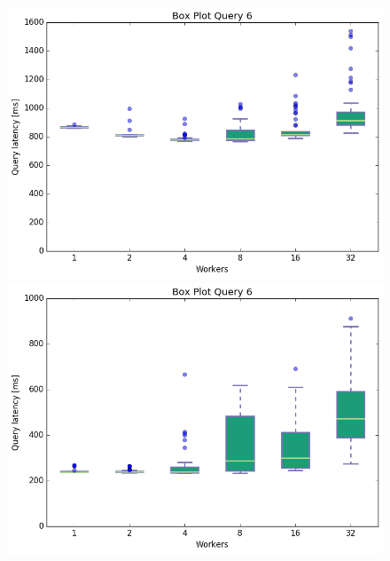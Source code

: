 \documentclass[11pt,singlecolumn]{scrartcl}
\begin{document}
\begin{figure}[!tbp]
  \centering
  \RawFloats
  \begin{minipage}[b]{0.5\textwidth}
    \includegraphics[width=\textwidth]{boxesfl/q6}
  \end{minipage}
  \hfill
  \begin{minipage}[b]{0.5\textwidth}
    \includegraphics[width=\textwidth]{boxesfs/q6}
  \end{minipage}
\end{figure}
\end{document}
